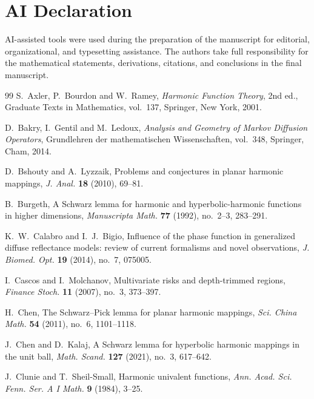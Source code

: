 \documentclass[11pt,reqno]{amsart}
\theoremstyle{remark}
\begin{document}
\section*{AI Declaration}
AI-assisted tools were used during the preparation of the manuscript for editorial, organizational, and typesetting assistance.  The authors take full responsibility for the mathematical statements, derivations, citations, and conclusions in the final manuscript.

\begin{thebibliography}{99}
S.~Axler, P.~Bourdon and W.~Ramey,
\newblock \emph{Harmonic Function Theory},
\newblock 2nd ed., Graduate Texts in Mathematics, vol.~137,
Springer, New York, 2001.

D.~Bakry, I.~Gentil and M.~Ledoux,
\newblock \emph{Analysis and Geometry of Markov Diffusion Operators},
\newblock Grundlehren der mathematischen Wissenschaften, vol.~348,
Springer, Cham, 2014.

D.~Bshouty and A.~Lyzzaik,
\newblock Problems and conjectures in planar harmonic mappings,
\newblock \emph{J. Anal.} \textbf{18} (2010), 69--81.

B.~Burgeth,
\newblock A Schwarz lemma for harmonic and hyperbolic-harmonic functions in higher dimensions,
\newblock \emph{Manuscripta Math.} \textbf{77} (1992), no.~2--3, 283--291.

K.~W.~Calabro and I.~J.~Bigio,
\newblock Influence of the phase function in generalized diffuse reflectance
models: review of current formalisms and novel observations,
\newblock \emph{J. Biomed. Opt.} \textbf{19} (2014), no.~7, 075005.

I.~Cascos and I.~Molchanov,
\newblock Multivariate risks and depth-trimmed regions,
\newblock \emph{Finance Stoch.} \textbf{11} (2007), no.~3, 373--397.

H.~Chen,
\newblock The Schwarz--Pick lemma for planar harmonic mappings,
\newblock \emph{Sci. China Math.} \textbf{54} (2011), no.~6, 1101--1118.

J.~Chen and D.~Kalaj,
\newblock A Schwarz lemma for hyperbolic harmonic mappings in the unit ball,
\newblock \emph{Math. Scand.} \textbf{127} (2021), no.~3, 617--642.

J.~Clunie and T.~Sheil-Small,
\newblock Harmonic univalent functions,
\newblock \emph{Ann. Acad. Sci. Fenn. Ser. A I Math.}
\textbf{9} (1984), 3--25.


\end{thebibliography}
\end{document}
